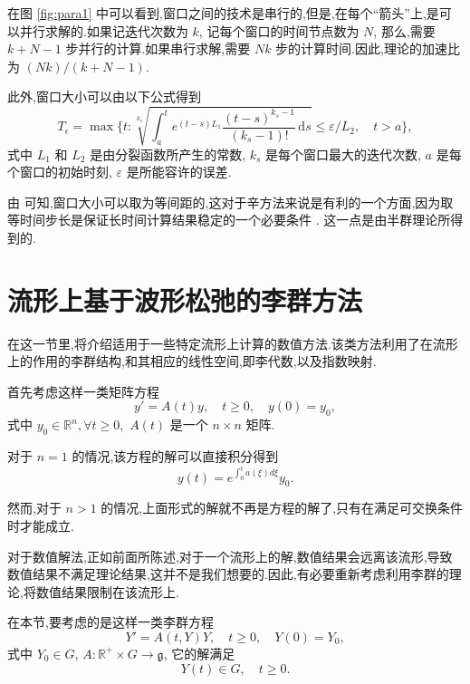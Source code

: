 在图 \ref{fig:para1} 中可以看到,窗口之间的技术是串行的,但是,在每个``箭头''上,是可以并行求解的.如果记迭代次数为 $k$, 记每个窗口的时间节点数为 $N$, 那么,需要 $k+N-1$ 步并行的计算.如果串行求解,需要 $Nk$ 步的计算时间.因此,理论的加速比为 $(Nk)/(k+N-1)$.

此外,窗口大小可以由以下公式得到 \cite{jiang2006windowing}
\begin{equation*}
  T_\epsilon=\max\Bigg\{t:\sqrt[k_s]{\int_a^te^{(t-s)L_1}\frac{(t-s)^{k_s-1}}{(k_s-1)!}\,\mathrm{d}s}\le \varepsilon/L_2,\quad t>a\Bigg\},
\end{equation*}
式中 $L_1$ 和 $L_2$ 是由分裂函数所产生的常数, $k_s$ 是每个窗口最大的迭代次数, $a$ 是每个窗口的初始时刻, $\varepsilon$ 是所能容许的误差.

由 \cite{jiang2006windowing} 可知,窗口大小可以取为等间距的,这对于辛方法来说是有利的一个方面,因为取等时间步长是保证长时间计算结果稳定的一个必要条件 \cite{hairer2006geometric}. 这一点是由半群理论所得到的.

\section{流形上基于波形松弛的李群方法}\label{sec:04wrmani}

在这一节里,将介绍适用于一些特定流形上计算的数值方法.该类方法利用了在流形上的作用的李群结构,和其相应的线性空间,即李代数,以及指数映射.

首先考虑这样一类矩阵方程
\begin{equation*}
	y'=A(t)y,\quad t\geq 0,\quad y(0)=y_0,
\end{equation*}
式中 $y_0\in \mathbb{R}^n,\forall t \geq 0,$ $A(t)$ 是一个 $n\times n$ 矩阵.

对于 $n=1$ 的情况,该方程的解可以直接积分得到
\begin{equation*}
	y(t)=e^{\int_0^ta(\xi)d\xi}y_0.
\end{equation*}

然而,对于 $n>1$ 的情况,上面形式的解就不再是方程的解了,只有在满足可交换条件时才能成立.

对于数值解法,正如前面所陈述,对于一个流形上的解,数值结果会远离该流形,导致数值结果不满足理论结果,这并不是我们想要的.因此,有必要重新考虑利用李群的理论,将数值结果限制在该流形上.

在本节,要考虑的是这样一类李群方程
\begin{equation*}
	Y'=A(t,Y)Y,\quad t\geq 0,\quad Y(0)=Y_0,
\end{equation*}
式中 $Y_0\in G $, $A:\mathbb{R}^+\times G\to \mathfrak{g}$, 它的解满足
\begin{equation*}
	Y(t)\in G,\quad t\geq 0.
\end{equation*}

